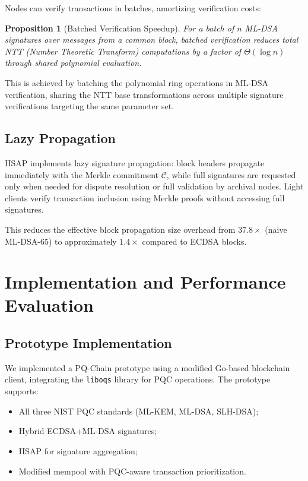 \documentclass[12pt, a4paper, twocolumn]{article}
\newtheorem{proposition}{Proposition}
\begin{document}
Nodes can verify transactions in batches, amortizing verification costs:

\begin{proposition}[Batched Verification Speedup]
For a batch of $n$ ML-DSA signatures over messages from a common block, batched verification reduces total NTT (Number Theoretic Transform) computations by a factor of $\Theta(\log n)$ through shared polynomial evaluation.
\end{proposition}

This is achieved by batching the polynomial ring operations in ML-DSA verification, sharing the NTT base transformations across multiple signature verifications targeting the same parameter set.

\subsection{Lazy Propagation}

HSAP implements lazy signature propagation: block headers propagate immediately with the Merkle commitment $\mathcal{C}$, while full signatures are requested only when needed for dispute resolution or full validation by archival nodes. Light clients verify transaction inclusion using Merkle proofs without accessing full signatures.

This reduces the effective block propagation size overhead from $37.8\times$ (naive ML-DSA-65) to approximately $1.4\times$ compared to ECDSA blocks.

\section{Implementation and Performance Evaluation}
\label{sec:implementation}

\subsection{Prototype Implementation}

We implemented a PQ-Chain prototype using a modified Go-based blockchain client, integrating the \texttt{liboqs} library \cite{stebila2020liboqs} for PQC operations. The prototype supports:

\begin{itemize}[noitemsep]
  \item All three NIST PQC standards (ML-KEM, ML-DSA, SLH-DSA);
  \item Hybrid ECDSA+ML-DSA signatures;
  \item HSAP for signature aggregation;
  \item Modified mempool with PQC-aware transaction prioritization.
\end{itemize}
\end{document}
